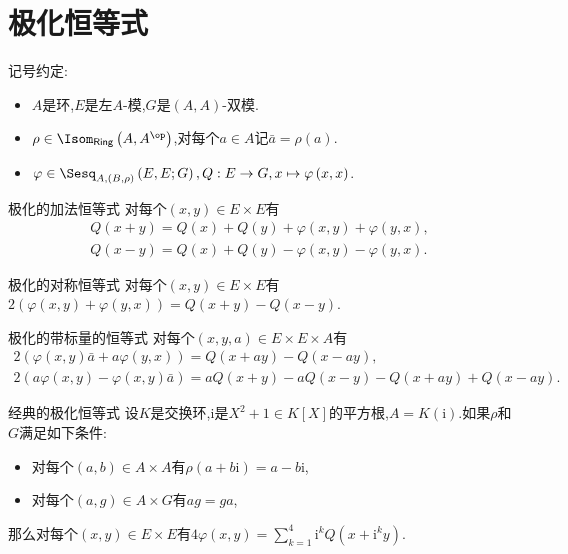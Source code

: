 \section{极化恒等式}

记号约定:
\begin{itemize}
	\item $A$是环,$E$是左$A$-模,$G$是$\left(A,A\right)$-双模.
	\item $\rho\in\Isom_{\mathsf{Ring}}\left(A,A^{\op}\right)$,对每个$a\in A$记$\bar{a}=\rho\left(a\right)$.
	\item $\varphi\in\Sesq_{A,(B,\rho)}\left(E,E;G\right),Q:E\to G,x\mapsto\varphi\left(x,x\right)$.
\end{itemize}



\begin{proposition}{极化的加法恒等式}{}
	对每个$\left(x,y\right)\in E\times E$有
	\begin{gather*}
		Q\left(x+y\right)=Q\left(x\right)+Q\left(y\right)+\varphi\left(x,y\right)+\varphi\left(y,x\right),\\
		Q\left(x-y\right)=Q\left(x\right)+Q\left(y\right)-\varphi\left(x,y\right)-\varphi\left(y,x\right).
	\end{gather*}
\end{proposition}

\begin{proposition}{极化的对称恒等式}{}
	对每个$\left(x,y\right)\in E\times E$有$2\left(\varphi\left(x,y\right)+\varphi\left(y,x\right)\right)=Q\left(x+y\right)-Q\left(x-y\right)$.
\end{proposition}

\begin{proposition}{极化的带标量的恒等式}{}
	对每个$\left(x,y,a\right)\in E\times E\times A$有
	\begin{gather*}
		2\left(\varphi\left(x,y\right)\bar{a}+a\varphi\left(y,x\right)\right)=Q\left(x+ay\right)-Q\left(x-ay\right),\\
		2\left(a\varphi\left(x,y\right)-\varphi\left(x,y\right)\bar{a}\right)=aQ\left(x+y\right)-aQ\left(x-y\right)-Q\left(x+ay\right)+Q\left(x-ay\right).
	\end{gather*}
\end{proposition}

\begin{proposition}{经典的极化恒等式}{}
	设$K$是交换环,$\mathrm{i}$是$X^{2}+1\in K[X]$的平方根,$A=K(\mathrm{i})$.如果$\rho$和$G$满足如下条件:
	\begin{itemize}
		\item 对每个$\left(a,b\right)\in A\times A$有$\rho\left(a+b\mathrm{i}\right)=a-b\mathrm{i}$,
		\item 对每个$\left(a,g\right)\in A\times G$有$ag=ga$,
	\end{itemize}
	那么对每个$\left(x,y\right)\in E\times E$有$4\varphi\left(x,y\right)=\sum\limits_{k=1}^{4}\mathrm{i}^{k}Q\left(x+\mathrm{i}^{k}y\right)$.
\end{proposition}








